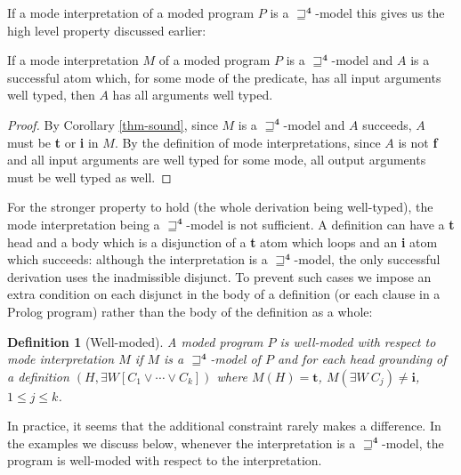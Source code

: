 \documentclass{tlp}
\newtheorem{definition}{Definition}
\newcommand{\Quad}{\ensuremath{\mathbf{4}}}
\begin{document}
\noindent
If a mode interpretation of a moded program $P$ is a
$\sqsupseteq^\Quad$-model
this gives us the high level property discussed earlier:
\begin{proposition} \rm
\label{lem-mode-head}
If a mode interpretation $M$ of a moded program $P$ is a
$\sqsupseteq^\Quad$-model and $A$ is a
successful atom which, for some mode of the predicate, has all input
arguments well typed, then $A$ has all arguments well typed.
\end{proposition}
\begin{proof}
By Corollary \ref{thm-sound}, since $M$ is a $\sqsupseteq^\Quad$-model
and $A$ succeeds,
$A$ must be \textbf{t} or \textbf{i} in $M$.  By the definition of mode
interpretations, since $A$ is not \textbf{f} and all input arguments
are well typed for some mode, all output arguments must be well typed
as well.
\end{proof}
For the stronger property to hold (the whole derivation being well-typed),
the mode interpretation being a $\sqsupseteq^\Quad$-model is not
sufficient.  A definition can have a \textbf{t} head and a body which is a
disjunction of a \textbf{t} atom which loops and an \textbf{i} atom which
succeeds: although the interpretation is a $\sqsupseteq^\Quad$-model, the
only successful derivation uses the inadmissible disjunct.  To prevent
such cases we impose an extra condition on each disjunct in the body of
a definition (or each clause in a Prolog program) rather than the body
of the definition as a whole:

\begin{definition}[Well-moded] \rm
A moded program $P$ is \emph{well-moded} with respect to
mode interpretation $M$ if $M$
is a $\sqsupseteq^\Quad$-model of $P$ and for each head grounding of a
definition $(H,\exists W[C_1 \lor \cdots \lor C_k])$ where $M(H) =
\mathbf{t}$, $M(\exists W ~ C_j) \neq \mathbf{i}$, $1 \leq j \leq k$.
\end{definition}

\noindent
In practice, it seems that the additional constraint rarely makes a
difference.  In the examples we discuss below, whenever the interpretation
is a $\sqsupseteq^\Quad$-model, the program is well-moded with respect
to the interpretation.
\end{document}

